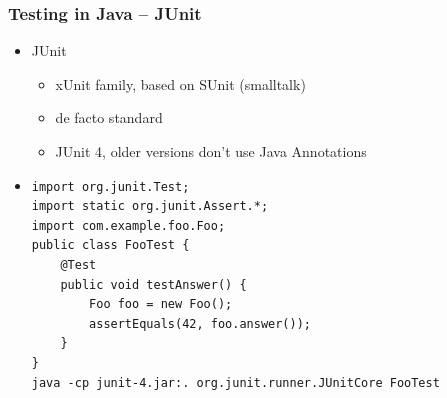 \documentclass[10pt,xcolor=pdflatex]{beamer}
\begin{document}
\begin{frame}[containsverbatim]\frametitle{Testing in Java -- JUnit}
\begin{itemize}
	\item JUnit
	  \begin{itemize}
		\item xUnit family, based on SUnit (smalltalk)
		\item de facto standard
		\item JUnit 4, older versions don't use Java Annotations
      \end{itemize}
    \item[] \begin{footnotesize} \begin{verbatim}
import org.junit.Test;
import static org.junit.Assert.*;
import com.example.foo.Foo;
public class FooTest {
    @Test
    public void testAnswer() {
        Foo foo = new Foo();
        assertEquals(42, foo.answer());
    }
}
java -cp junit-4.jar:. org.junit.runner.JUnitCore FooTest
	\end{verbatim}
    \end{footnotesize}
\end{itemize}
\end{frame}
\end{document}

